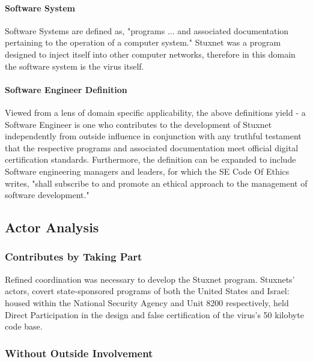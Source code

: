 \documentclass[12pt]{article}
\begin{document}
\begin{multicols}{2}
\paragraph{Software System}

Software Systems are defined as, "programs ... and associated documentation pertaining to the operation of a computer system."\cite{softwareSystemDefinition} Stuxnet was a program designed to inject itself into other computer networks, therefore in this domain the software system is the virus itself.\cite{w32.stuxnetDossier}

\paragraph{Software Engineer Definition}

Viewed from a lens of domain specific applicability, the above definitions yield - a Software Engineer is one who contributes to the development of Stuxnet independently from outside influence in conjunction with any truthful testament that the respective programs and associated documentation meet official digital certification standards. Furthermore, the definition can be expanded to include Software engineering managers and leaders, for which the SE Code Of Ethics writes, "shall subscribe to and promote an ethical approach to the management of software development."\cite{softwareEngineeringCodeOfEthics}

\subsection{Actor Analysis}

\subsubsection{Contributes by Taking Part}

Refined coordination was necessary to develop the Stuxnet program. Stuxnets' actors, covert state-sponsored programs of both the United States and Israel: housed within the National Security Agency and Unit 8200 respectively, held Direct Participation in the design and false certification of the virus's 50 kilobyte code base.\cite{nsaAndUnit8200}\cite{w32.stuxnetDossier}

\subsubsection{Without Outside Involvement}


\end{multicols}
\end{document}
